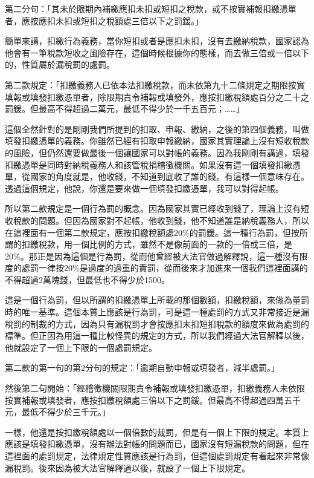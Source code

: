 \documentclass[oneside,sub3section]{ctexbook}
\begin{document}
第二分句：「其未於限期內補繳應扣未扣或短扣之稅款，或不按實補報扣繳憑單者，應按應扣未扣或短扣之稅額處三倍以下之罰鍰。」

簡單來講，扣繳行為義務，當你短扣或者是應扣未扣，沒有去繳納稅款，國家認為他會有一筆稅款短收之風險存在，這個時候根據你的態樣，而去做三倍或一倍以下的，性質屬於漏稅罰的處罰。

第二款規定：「扣繳義務人已依本法扣繳稅款，而未依第九十二條規定之期限按實填報或填發扣繳憑單者，除限期責令補報或填發外，應按扣繳稅額處百分之二十之罰鍰。但最高不得超過二萬元，最低不得少於一千五百元；\ldots\ldots」

這個全然針對的是剛剛我們所提到的扣取、申報、繳納，之後的第四個義務，叫做填發扣繳憑單的義務。你雖然已經有扣取申報繳納，國家其實理論上沒有短收稅款的風險，但仍然還要做最後一個讓國家可以對帳的義務。因為我剛剛有講過，填發扣繳憑單是同時對納稅義務人和該管稅捐稽徵機關。如果沒有這一個填發扣繳憑單，從國家的角度就是，他收錢，不知道到底收了誰的錢。有這樣一個意味存在。透過這個規定，他說，你還是要來做一個填發扣繳憑單，我可以對得起帳。

所以第二款規定是一個行為罰的概念。因為國家其實已經收到錢了，理論上沒有短收稅款的問題。但因為國家對不起帳，他收到錢，他不知道誰是納稅義務人，所以在這裡面有一個第二款規定，應按扣繳稅額處20\%的罰鍰。這一種行為罰，但按所謂的扣繳稅款，用一個比例的方式，雖然不是像前面的一款的一倍或三倍，是20\%。那正是因為這個是行為罰，從而他曾經被大法官做過解釋說，這一種沒有限度的處罰一律按20\%是過度的過重的責罰，從而後來才加進來一個我們這裡面講的不得超過2萬塊錢，但最低也不得少於1500。

這是一個行為罰，但以所謂的扣繳憑單上所載的那個數額，扣繳稅額，來做為量罰時的唯一基準。這個本質上應該是行為罰，可是這一種處罰的方式又非常接近是漏稅罰的制裁的方式，因為只有漏稅罰才會按應扣未扣短扣稅款的額度來做為處罰的標準。但正因為用這一種比較怪異的規定的方式，所以我們經過大法官解釋以後，他就設定了一個上下限的一個處罰規定。

第二款的第一句的第2分句的規定：「逾期自動申報或填發者，減半處罰。」

然後第二句開始：「經稽徵機關限期責令補報或填發扣繳憑單，扣繳義務人未依限按實補報或填發者，應按扣繳稅額處三倍以下之罰鍰。但最高不得超過四萬五千元，最低不得少於三千元。」

一樣，他還是按扣繳稅額處以一個倍數的裁罰，但是有一個上下限的規定。本質上應該是填發扣繳憑單，沒有辦法對帳的問題而已，國家沒有短漏稅款的問題，但在這裡面的處罰規定，法律規定性質應該是行為罰，但這個處罰規定有看起來非常像漏稅罰。後來因為被大法官解釋過以後，就設了一個上下限規定。
\end{document}

